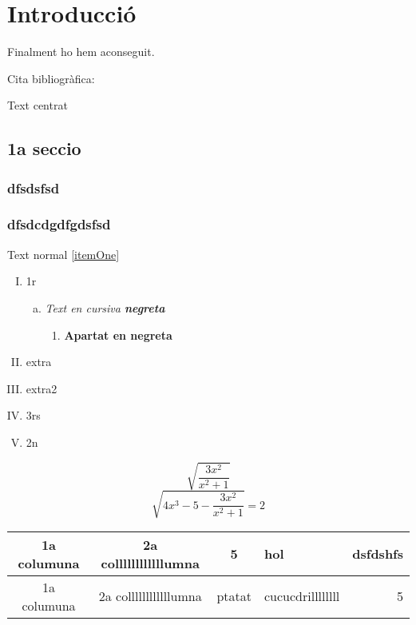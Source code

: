\chapter{Introducció}

Finalment ho hem aconseguit.

Cita bibliogràfica: \cite{TP} \cite{GNU-ca}


\begin{center}
  Text centrat
\end{center}

\section{1a seccio}

\subsection{dfsdsfsd}
\subsection{dfsdcdgdfgdsfsd}

Text normal \ref{itemOne}

\begin{enumerate}[(I)]
 \item 1r
 \begin{enumerate}[a)]
  \item \textit{Text en cursiva \textbf{negreta}}
  \begin{enumerate} [1)]
   \item \textbf{Apartat en negreta}
  \end{enumerate}

 \end{enumerate}
 \item extra
 \item extra2
 \item\label{itemOne} 3rs
 \item 2n
\end{enumerate}

$$\sqrt{\frac{3x^2}{x^2 +1}}$$
$$\sqrt{{4x^3 -5} - \frac{3x^2}{x^2 +1}} = 2$$



\vspace*{4.3truecm}


\begin{tabular}{|cc|c|l|r|}
 \hline 1a columuna & 2a collllllllllllumna & 5 & hol & dsfdshfs\\ \hline
 1a columuna & 2a collllllllllllumna & ptatat & cucucdrillllllll & 5 \\ \hline

\end{tabular}
